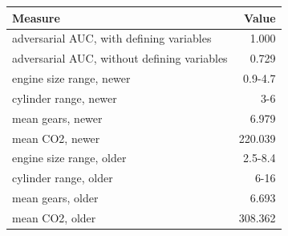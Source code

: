 \begin{tabular}{lr}
\toprule
Measure & Value \\
\midrule
adversarial AUC, with defining variables & 1.000 \\
adversarial AUC, without defining variables & 0.729 \\
engine size range, newer & 0.9-4.7 \\
cylinder range, newer & 3-6 \\
mean gears, newer & 6.979 \\
mean CO2, newer & 220.039 \\
engine size range, older & 2.5-8.4 \\
cylinder range, older & 6-16 \\
mean gears, older & 6.693 \\
mean CO2, older & 308.362 \\
\bottomrule
\end{tabular}
